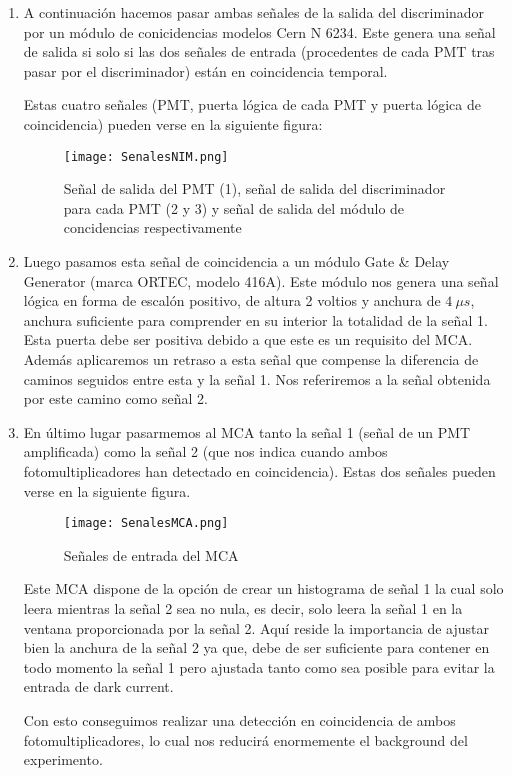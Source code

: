 \begin{enumerate}
\item{} A continuación hacemos pasar ambas señales de la salida del discriminador por un módulo de conicidencias modelos Cern N 6234. Este genera una señal de salida si solo si las dos señales de entrada (procedentes de cada PMT tras pasar por el discriminador) están en coincidencia temporal. 

Estas cuatro señales (PMT, puerta lógica de cada PMT y puerta lógica de coincidencia) pueden verse en la siguiente figura:

\begin{figure}[hbtp]
\centering
\texttt{[image: SenalesNIM.png]}
\caption{ Señal de salida del PMT (1), señal de salida del discriminador para cada PMT (2 y 3) y señal de salida del módulo de concidencias respectivamente}
\end{figure}


\item {} Luego pasamos esta señal de coincidencia a un módulo Gate \& Delay Generator (marca ORTEC, modelo 416A). Este módulo nos genera una señal lógica en forma de escalón positivo, de altura 2 voltios y anchura de $4~\mu s$, anchura suficiente para comprender en su interior la totalidad de la señal 1. Esta puerta debe ser positiva debido a que este es un requisito del MCA. Además aplicaremos un retraso a esta señal que compense la diferencia de caminos seguidos entre esta y la señal 1. Nos referiremos a la señal obtenida por este camino como señal 2.

\item {} En último lugar pasarmemos al MCA tanto la señal 1 (señal de un PMT amplificada) como la señal 2 (que nos indica cuando ambos fotomultiplicadores han detectado en coincidencia). Estas dos señales pueden verse en la siguiente figura.

\begin{figure}[hbtp]
\centering
\texttt{[image: SenalesMCA.png]}
\caption{Señales de entrada del MCA}
\end{figure}


Este MCA dispone de la opción de crear un histograma de señal 1 la cual solo leera mientras la señal 2 sea no nula, es decir, solo leera la señal 1 en la ventana proporcionada por la señal 2. Aquí reside la importancia de ajustar bien la anchura de la señal 2 ya que, debe de ser suficiente para contener en todo momento la señal 1 pero ajustada tanto como sea posible para evitar la entrada de dark current.

Con esto conseguimos realizar una detección en coincidencia de ambos fotomultiplicadores, lo cual nos reducirá enormemente el background del experimento.

\end{enumerate}




